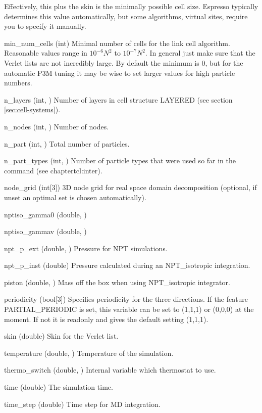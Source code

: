 \begin{globvar}
  Effectively, this plus the skin is the minimally possible cell size.
  Espresso typically determines this value automatically, but some
  algorithms, \eg{} virtual sites, require you to specify it manually.
\item[min_num_cells] (int) Minimal number of cells for the link cell
  algorithm. Reasonable values range in $10^{-6} N^2$ to $10^{-7}
  N^2$. In general just make sure that the Verlet lists are not
  incredibly large. By default the minimum is 0, but for the automatic
  P3M tuning it may be wise to set larger values for high particle
  numbers.
\item[n_layers] (int, \ro) Number of layers in cell structure LAYERED
  (see section \vref{sec:cell-systems}).
\item[n_nodes] (int, \ro) Number of nodes.
\item[n_part] (int, \ro) Total number of particles.
\item[n_part_types] (int, \ro) Number of particle types that were
  used so far in the  command (see chapter{tcl:inter}).
\item[node_grid] (int[3]) 3D node grid for real space domain
  decomposition (optional, if unset an optimal set is chosen
  automatically).
\item[nptiso_gamma0] (double, \ro)
\item[nptiso_gammav] (double, \ro)
\item[npt_p_ext] (double, \ro) Pressure for NPT simulations.
\item[npt_p_inst] (double) Pressure calculated during an
  NPT_isotropic integration.
\item[piston] (double, \ro) Mass off the box when using NPT_isotropic
  integrator.
\item[periodicity] (bool[3]) Specifies periodicity for the three
  directions. If the feature PARTIAL_PERIODIC is set, this variable
  can be set to (1,1,1) or (0,0,0) at the moment.  If not it is
  readonly and gives the default setting (1,1,1).
\item[skin] (double) Skin for the Verlet list.
\item [temperature] (double, \ro) Temperature of the
  simulation.
\item[thermo_switch] (double, \ro) Internal variable which thermostat
  to use. 
\item[time] (double) The simulation time.
\item[time_step] (double) Time step for MD integration.

\end{globvar}
